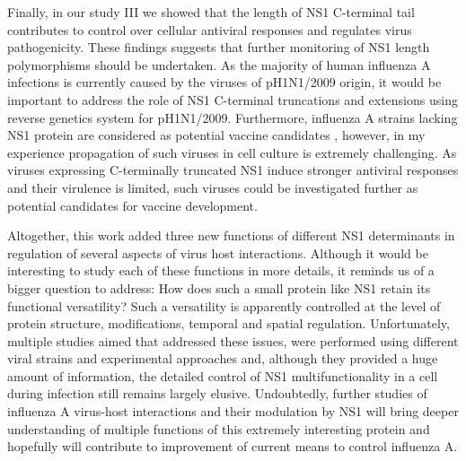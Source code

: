 		Finally, in our study III we showed that the length of NS1 C-terminal tail contributes to control over cellular antiviral responses and regulates virus pathogenicity. These findings suggests that further monitoring of NS1 length polymorphisms should be undertaken. As the majority of human influenza A infections is currently caused by the viruses of pH1N1/2009 origin, it would be important to address the role of NS1 C-terminal truncations and extensions using reverse genetics system for pH1N1/2009. Furthermore, influenza A strains lacking NS1 protein are considered as potential vaccine candidates \parencite{Mossler2013}, however, in my experience propagation of such viruses in cell culture is extremely challenging. As viruses expressing C-terminally truncated NS1 induce stronger antiviral responses and their virulence is limited, such viruses could be investigated further as potential candidates for vaccine development.

		Altogether, this work added three new functions of different NS1 determinants in regulation of several aspects of virus host interactions. Although it would be interesting to study each of these functions in more details, it reminds us of a bigger question to address: How does such a small protein like NS1 retain its functional versatility? Such a versatility is apparently controlled at the level of protein structure, modifications, temporal and spatial regulation. Unfortunately, multiple studies aimed that addressed these issues, were performed using different viral strains and experimental approaches and, although they provided a huge amount of information, the detailed control of NS1 multifunctionality in a cell during infection still remains largely elusive. Undoubtedly, further studies of influenza A virus-host interactions and their modulation by NS1 will bring deeper understanding of multiple functions of this extremely interesting protein and hopefully will contribute to improvement of current means to control influenza A. 
		
		
		

	
	
	
